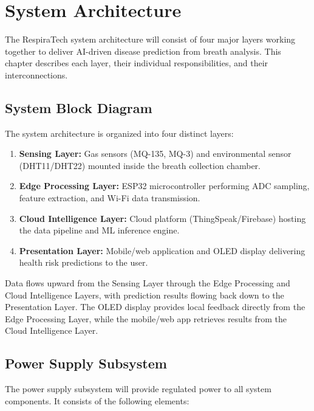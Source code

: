 \chapter{System Architecture}

The RespiraTech system architecture will consist of four major layers working together to deliver AI-driven disease prediction from breath analysis. This chapter describes each layer, their individual responsibilities, and their interconnections.

\section{System Block Diagram}

The system architecture is organized into four distinct layers:

\begin{enumerate}[leftmargin=1.5cm]
\item \textbf{Sensing Layer:} Gas sensors (MQ-135, MQ-3) and environmental sensor (DHT11/DHT22) mounted inside the breath collection chamber.
\item \textbf{Edge Processing Layer:} ESP32 microcontroller performing ADC sampling, feature extraction, and Wi-Fi data transmission.
\item \textbf{Cloud Intelligence Layer:} Cloud platform (ThingSpeak/Firebase) hosting the data pipeline and ML inference engine.
\item \textbf{Presentation Layer:} Mobile/web application and OLED display delivering health risk predictions to the user.
\end{enumerate}

Data flows upward from the Sensing Layer through the Edge Processing and Cloud Intelligence Layers, with prediction results flowing back down to the Presentation Layer. The OLED display provides local feedback directly from the Edge Processing Layer, while the mobile/web app retrieves results from the Cloud Intelligence Layer.

\section{Power Supply Subsystem}
The power supply subsystem will provide regulated power to all system components. It consists of the following elements:

